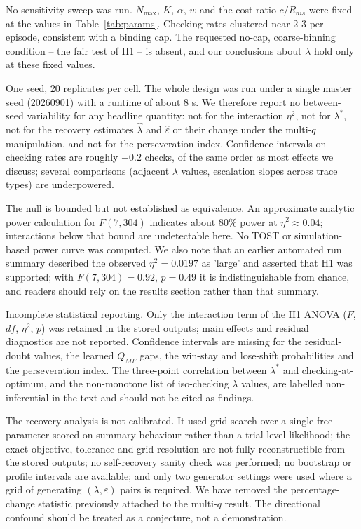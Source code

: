 \documentclass[11pt,a4paper]{article}
\begin{document}
No sensitivity sweep was run. $N_{\max}$, $K$, $\alpha$, $w$ and the cost ratio $c/R_{dis}$ were fixed at the values in Table~\ref{tab:params}. Checking rates clustered near 2-3 per episode, consistent with a binding cap. The requested no-cap, coarse-binning condition -- the fair test of H1 -- is absent, and our conclusions about $\lambda$ hold only at these fixed values.

One seed, 20 replicates per cell. The whole design was run under a single master seed (20260901) with a runtime of about 8 s. We therefore report no between-seed variability for any headline quantity: not for the interaction $\eta^2$, not for $\lambda^{*}$, not for the recovery estimates $\hat{\lambda}$ and $\hat{\varepsilon}$ or their change under the multi-$q$ manipulation, and not for the perseveration index. Confidence intervals on checking rates are roughly $\pm 0.2$ checks, of the same order as most effects we discuss; several comparisons (adjacent $\lambda$ values, escalation slopes across trace types) are underpowered.

The null is bounded but not established as equivalence. An approximate analytic power calculation for $F(7,304)$ indicates about 80\% power at $\eta^2 \approx 0.04$; interactions below that bound are undetectable here. No TOST or simulation-based power curve was computed. We also note that an earlier automated run summary described the observed $\eta^2 = 0.0197$ as 'large' and asserted that H1 was supported; with $F(7,304)=0.92$, $p=0.49$ it is indistinguishable from chance, and readers should rely on the results section rather than that summary.

Incomplete statistical reporting. Only the interaction term of the H1 ANOVA ($F$, $df$, $\eta^2$, $p$) was retained in the stored outputs; main effects and residual diagnostics are not reported. Confidence intervals are missing for the residual-doubt values, the learned $Q_{MF}$ gaps, the win-stay and lose-shift probabilities and the perseveration index. The three-point correlation between $\lambda^{*}$ and checking-at-optimum, and the non-monotone list of iso-checking $\lambda$ values, are labelled non-inferential in the text and should not be cited as findings.

The recovery analysis is not calibrated. It used grid search over a single free parameter scored on summary behaviour rather than a trial-level likelihood; the exact objective, tolerance and grid resolution are not fully reconstructible from the stored outputs; no self-recovery sanity check was performed; no bootstrap or profile intervals are available; and only two generator settings were used where a grid of generating $(\lambda, \varepsilon)$ pairs is required. We have removed the percentage-change statistic previously attached to the multi-$q$ result. The directional confound should be treated as a conjecture, not a demonstration.
\end{document}
